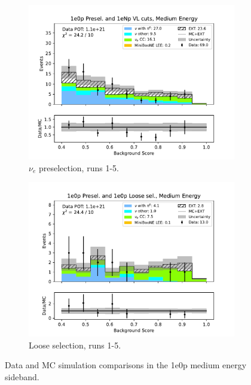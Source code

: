 \begin{figure}[H]
\begin{subfigure}{0.5\linewidth}
        \includegraphics[width=\linewidth]{technote/Sidebands/Figures/NearSideband/near_sideband_bkg_score_run1234b4c4d5_ZP_ZP_MEDIUM_ENERGY.pdf}
        \caption{$\nu_e$ preselection, runs 1-5.}
    \end{subfigure}%
    \begin{subfigure}{0.5\linewidth}
        \includegraphics[width=\linewidth]{technote/Sidebands/Figures/NearSideband/near_sideband_bkg_score_run1234b4c4d5_ZP_ZPLOOSESEL_MEDIUM_ENERGY.pdf}
        \caption{Loose selection, runs 1-5.}
    \end{subfigure}
    \caption{Data and MC simulation comparisons in the 1e0p medium energy sideband.}
\end{figure}

